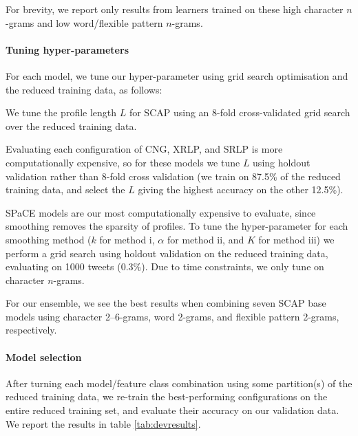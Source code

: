 \documentclass[twocolumn,10pt]{article}
\begin{document}
For brevity, we report only results from learners trained on these high
character $n$-grams and low word/flexible pattern $n$-grams.


\paragraph{Tuning hyper-parameters}

For each model, we tune our hyper-parameter using grid search
optimisation and the reduced training data, as follows:

We tune the profile length $L$ for SCAP using an 8-fold cross-validated
grid search over the reduced training data.

Evaluating each configuration of CNG, XRLP, and SRLP is more
computationally expensive, so for these models we tune $L$ using
holdout validation rather than 8-fold cross validation
(we train on 87.5\% of the reduced training data, and select the $L$
giving the highest accuracy on the other 12.5\%).

SPaCE models are our most computationally expensive to evaluate,
since smoothing removes the sparsity of profiles.
To tune the hyper-parameter for each smoothing method
($k$ for method i, $\alpha$ for method ii, and $K$ for method iii)
we perform a grid search using holdout validation on the reduced training
data, evaluating on 1000 tweets (0.3\%).
Due to time constraints, we only tune on character $n$-grams.

For our ensemble, we see the best results when combining
seven SCAP base models using character 2--6-grams,
word 2-grams, and flexible pattern 2-grams, respectively.


\paragraph{Model selection}
After turning each model/feature class combination using some 
partition(s) of the reduced training data, we re-train the
best-performing configurations on the entire reduced training set,
and evaluate their accuracy on our validation data.
We report the results in table \ref{tab:devresults}.
\end{document}
